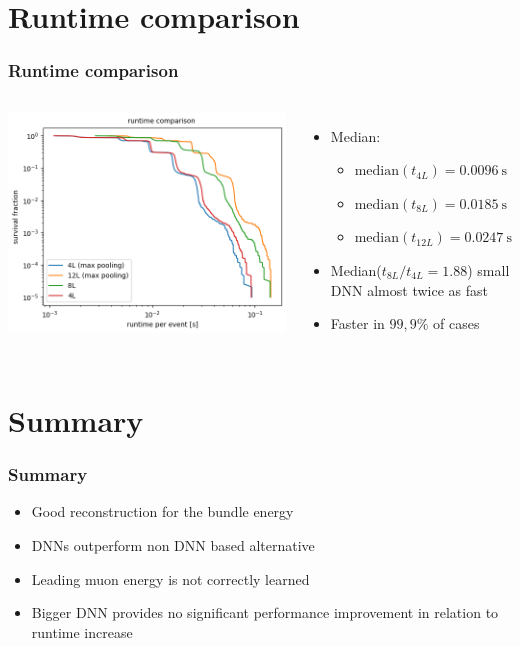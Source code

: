 \documentclass[aspectratio=1610, 9pt]{beamer}
\begin{document}
\section{Runtime comparison}
\begin{frame}
  \frametitle{Runtime comparison}
  \begin{columns}
      \includegraphics[scale=0.45]{Plots/Runtime comparison}
      \begin{itemize}
        \item Median:
        \begin{itemize}
          \item $\mathrm{median}(t_{4L})=\SI{0,0096}{\second}$
          \item $\mathrm{median}(t_{8L})=\SI{0,0185}{\second}$ 
          \item $\mathrm{median}(t_{12L})=\SI{0,0247}{\second}$
        \end{itemize}
        \item Median($t_{8L}/t_{4L}=\num{1,88}$) \rightarrow small DNN almost twice as fast
        \item Faster in $99,9\%$ of cases
      \end{itemize}
  \end{columns}
\end{frame}
\section{Summary}
\begin{frame}
  \frametitle{Summary}
  \begin{itemize}
    \item Good reconstruction for the bundle energy
    \item DNNs outperform non DNN based alternative
    \item Leading muon energy is not correctly learned
    \item Bigger DNN provides no significant performance improvement in relation to runtime increase
  \end{itemize}
\end{frame}
\end{document}
